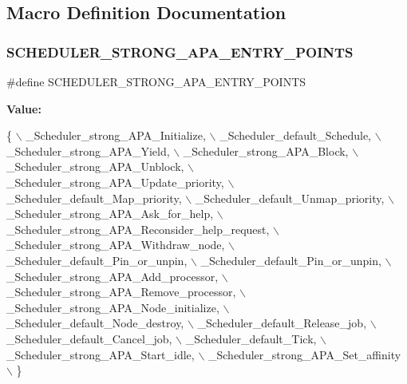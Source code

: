 \subsection{Macro Definition Documentation}
\mbox{\label{group__RTEMSScoreSchedulerStrongAPA_ga98b37281082c0be47dc489eed554c5cc}} 
\subsubsection{\texorpdfstring{S\+C\+H\+E\+D\+U\+L\+E\+R\+\_\+\+S\+T\+R\+O\+N\+G\+\_\+\+A\+P\+A\+\_\+\+E\+N\+T\+R\+Y\+\_\+\+P\+O\+I\+N\+TS}{SCHEDULER\_STRONG\_APA\_ENTRY\_POINTS}}
{\footnotesize\ttfamily \#define S\+C\+H\+E\+D\+U\+L\+E\+R\+\_\+\+S\+T\+R\+O\+N\+G\+\_\+\+A\+P\+A\+\_\+\+E\+N\+T\+R\+Y\+\_\+\+P\+O\+I\+N\+TS}

{\bfseries Value\+:}
\begin{DoxyCode}
\{ \(\backslash\)
    \_Scheduler\_strong\_APA\_Initialize, \(\backslash\)
    \_Scheduler\_default\_Schedule, \(\backslash\)
    \_Scheduler\_strong\_APA\_Yield, \(\backslash\)
    \_Scheduler\_strong\_APA\_Block, \(\backslash\)
    \_Scheduler\_strong\_APA\_Unblock, \(\backslash\)
    \_Scheduler\_strong\_APA\_Update\_priority, \(\backslash\)
    \_Scheduler\_default\_Map\_priority, \(\backslash\)
    \_Scheduler\_default\_Unmap\_priority, \(\backslash\)
    \_Scheduler\_strong\_APA\_Ask\_for\_help, \(\backslash\)
    \_Scheduler\_strong\_APA\_Reconsider\_help\_request, \(\backslash\)
    \_Scheduler\_strong\_APA\_Withdraw\_node, \(\backslash\)
    \_Scheduler\_default\_Pin\_or\_unpin, \(\backslash\)
    \_Scheduler\_default\_Pin\_or\_unpin, \(\backslash\)
    \_Scheduler\_strong\_APA\_Add\_processor, \(\backslash\)
    \_Scheduler\_strong\_APA\_Remove\_processor, \(\backslash\)
    \_Scheduler\_strong\_APA\_Node\_initialize, \(\backslash\)
    \_Scheduler\_default\_Node\_destroy, \(\backslash\)
    \_Scheduler\_default\_Release\_job, \(\backslash\)
    \_Scheduler\_default\_Cancel\_job, \(\backslash\)
    \_Scheduler\_default\_Tick, \(\backslash\)
    \_Scheduler\_strong\_APA\_Start\_idle, \(\backslash\)
    \_Scheduler\_strong\_APA\_Set\_affinity \(\backslash\)
  \}
\end{DoxyCode}


